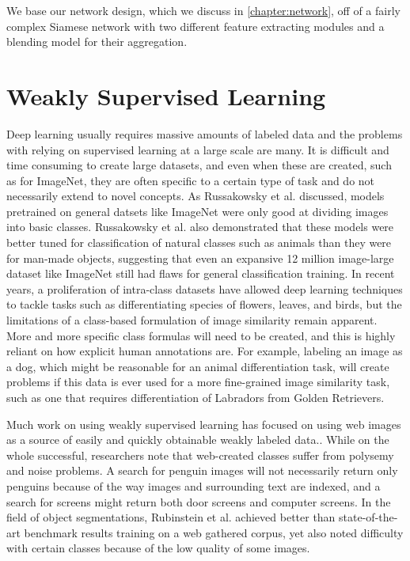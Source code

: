 We base our network design, which we discuss in \ref{chapter:network}, off of a fairly complex Siamese network with two different feature extracting modules and a blending model for their aggregation.


\section{Weakly Supervised Learning}
Deep learning usually requires massive amounts of labeled data and the problems with relying on supervised learning at a large scale are many. It is difficult and time consuming to create large datasets, and even when these are created, such as for ImageNet, they are often specific to a certain type of task and do not necessarily extend to novel concepts. As Russakowsky et al. discussed\cite{russakovsky2013detecting}, models pretrained on general datsets like ImageNet were only good at dividing images into basic classes. Russakowsky et al. also demonstrated that these models were better tuned for classification of natural classes such as animals than they were for man-made objects, suggesting that even an expansive 12 million image-large dataset like ImageNet still had flaws for general classification training. In recent years, a proliferation of intra-class datasets have allowed deep learning techniques to tackle tasks such as differentiating species of flowers\cite{angelova2013image}, leaves\cite{rejeb2013vantage}, and birds\cite{berg2014birdsnap}, but the limitations of a class-based formulation of image similarity remain apparent. More and more specific class formulas will need to be created, and this is highly reliant on how explicit human annotations are. For example, labeling an image as a dog, which might be reasonable for an animal differentiation task, will create problems if this data is ever used for a more fine-grained image similarity task, such as one that requires differentiation of Labradors from Golden Retrievers.

Much work on using weakly supervised learning has focused on using web images as a source of easily and quickly obtainable weakly labeled data.\cite{bergamo2010exploiting}\cite{fergus2010learning}\cite{li2010optimol}\cite{schroff2011harvesting}. While on the whole successful, researchers note that web-created classes suffer from polysemy and noise problems. A search for penguin images will not necessarily return only penguins because of the way images and surrounding text are indexed, and a search for screens might return both door screens and computer screens. In the field of object segmentations, Rubinstein et al. achieved better than state-of-the-art benchmark results training on a web gathered corpus, yet also noted difficulty with certain classes because of the low quality of some images.\cite{rubinstein2013unsupervised}


